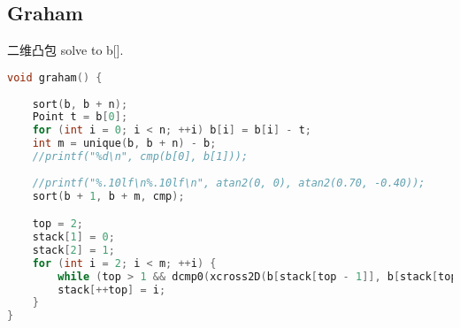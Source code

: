 \subsection{Graham}
 二维凸包 solve to b[]. 
\begin{lstlisting}[language=C++]
void graham() {
	
	sort(b, b + n);
	Point t = b[0];
	for (int i = 0; i < n; ++i) b[i] = b[i] - t;
	int m = unique(b, b + n) - b;
	//printf("%d\n", cmp(b[0], b[1]));
	
	//printf("%.10lf\n%.10lf\n", atan2(0, 0), atan2(0.70, -0.40));
	sort(b + 1, b + m, cmp);

	top = 2;
	stack[1] = 0;
	stack[2] = 1;
	for (int i = 2; i < m; ++i) {
		while (top > 1 && dcmp0(xcross2D(b[stack[top - 1]], b[stack[top]], b[i])) <= 0 ) --top;
		stack[++top] = i;
	}
}
\end{lstlisting}
